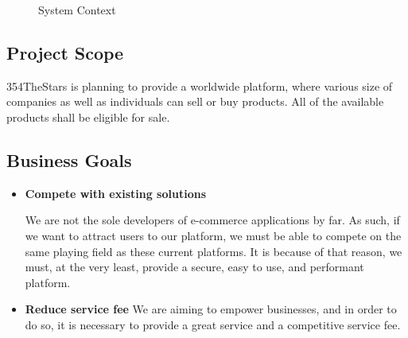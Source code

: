 \documentclass[11pt]{article}
\newcounter{use case ID}
\begin{document}
\clearpage

\begin{figure}[htbp]
    \caption{System Context}
    \label{fig:system-context}
\end{figure}

\subsection{Project Scope}
354TheStars is planning to provide a worldwide platform, where various size of companies as well as individuals can sell or buy products. All of the available products shall be eligible for sale.

\subsection{Business Goals}

\begin{itemize}
    \item \textbf{Compete with existing solutions}

        We are not the sole developers of e-commerce applications by far. As such, if we want to attract users to our platform, we must be able to compete on the same playing field as these current platforms. It is because of that reason, we must, at the very least, provide a secure, easy to use, and performant platform.

    \item \textbf{Reduce service fee}
        We are aiming to empower businesses, and in order to do so, it is necessary to provide a great service and a competitive service fee.

\end{itemize}
\end{document}
